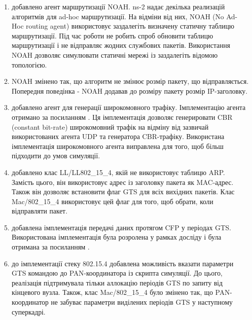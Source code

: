 \documentclass[a4paper,ukrainian,utf8,nocolumnsxix,floatsection]{eskdtext}
\begin{document}
\begin{enumerate}
	\item добавлено агент маршрутизації NOAH. ns-2 надає декілька реализацій алгоритмів для ad-hoc маршрутизації. На відміни від них, NOAH (No Ad-Hoc routing agent) використовує заздалегіть визначену статичну таблицю маршрутизації. Під час роботи не робить спроб обновити таблицю маршрутизації і не відправляє жодних службових пакетів. Використання NOAH дозволяє симулювати статичні мережі із заздалегіть відомою топологією.

	\item NOAH змінено так, що алгоритм не змінює розмір пакету, що відправляється. Попередня поведінка - NOAH додавав до розміру пакету розмір IP-заголовку. 

	\item добавлено агент для генерації широкомовного трафіку. Імплементацію агента отримано за посиланням . Ця імплементація дозволяє генерировати CBR (constant bit-rate) широкомовний трафік на відміну від зазвичай використованих агента UDP та генератора CBR-трафіку. Використана імплементація широкомовного агента виправлена для того, щоб більш підходити до умов симуляції.

	\item добавлено клас LL/LL802\_15\_4, якій не використовує таблицю ARP. Замість цього, він використовує адрес із заголовку пакета як MAC-адрес. Також він дозволяє встановити флаг GTS для всіх вихідних пакетів. Клас Mac/802\_15\_4 використовує цей флаг для того, щоб обрати, коли відправляти пакет. 

	\item добавлена імплементація передачі даних протягом CFP у періодах GTS. Використована імплементація була розролена у рамках досліду  і була отримана за посиланням .

	\item до імплементації стеку 802.15.4 добавлена можливість вказати параметри GTS командою до PAN-координатора із скрипта симуляції. До цього, реалізація підтримувала тільки аллокацію періодів GTS по запиту від кінцевого вузла. Також, клас Mac/802\_15\_4 було змінено так, що PAN-координатор не забуває параметри виділених періодів GTS у наступному суперкадрі.


\end{enumerate}
\end{document}
